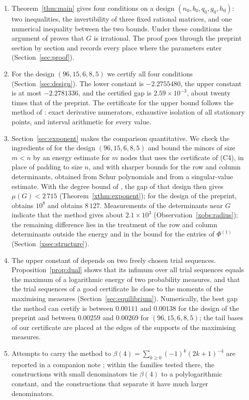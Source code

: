 \documentclass[11pt]{article}
\theoremstyle{definition}
\begin{document}
\begin{enumerate}
\item Theorem~\ref{thm:main} gives four conditions on a design $(n_0,b_0,q_0,g_0,h_0)$: two inequalities, the invertibility of three fixed rational matrices, and one numerical inequality between the two bounds. Under these conditions the argument of \cite{OAI} proves that $G$ is irrational. The proof goes through the preprint section by section and records every place where the parameters enter (Section~\ref{sec:proof}).
\item For the design $(96,15,6,8,5)$ we certify all four conditions (Section~\ref{sec:design}). The lower constant is $-2.2755480$, the upper constant is at most $-2.2781336$, and the certified gap is $2.59\times10^{-3}$, about twenty times that of the preprint. The certificate for the upper bound follows the method of \cite[Sec.~7]{OAI}: exact derivative numerators, exhaustive isolation of all stationary points, and interval arithmetic for every value.
\item Section~\ref{sec:exponent} makes the comparison quantitative. We check the ingredients of \cite{Jha} for the design $(96,15,6,8,5)$ and bound the minors of size $m<n$ by an energy estimate for $m$ nodes that uses the certificate of (C4), in place of padding to size $n$, and with sharper bounds for the row and column determinants, obtained from Schur polynomials and from a singular-value estimate. With the degree bound of \cite{Litsey}, the gap of that design then gives $\mu(G)<2\,715$ (Theorem~\ref{xthm:exponent}); for the design of the preprint, \cite{Jha} obtains $10^8$ and \cite{Litsey} obtains $8\,127$. Measurements of the determinants near $G$ indicate that the method gives about $2.1\times10^3$ (Observation~\ref{xobs:radius}); the remaining difference lies in the treatment of the row and column determinants outside the energy and in the bound for the entries of $\Phi^{(1)}$ (Section~\ref{xsec:structure}).
\item The upper constant of \cite[Prop.~6.1]{OAI} depends on two freely chosen trial sequences. Proposition~\ref{prop:dual} shows that its infimum over all trial sequences equals the maximum of a logarithmic energy of two probability measures, and that the trial sequences of a good certificate lie close to the moments of the maximising measures (Section~\ref{sec:equilibrium}). Numerically, the best gap the method can certify is between $0.00111$ and $0.00138$ for the design of the preprint and between $0.00259$ and $0.00269$ for $(96,15,6,8,5)$; the tail bases of our certificate are placed at the edges of the supports of the maximising measures.
\item Attempts to carry the method to $\beta(4)=\sum_{k\ge0}(-1)^k(2k+1)^{-4}$ are reported in a companion note \cite{MCSC3}; within the families tested there, the constructions with small denominators tie $\beta(4)$ to a polylogarithmic constant, and the constructions that separate it have much larger denominators.
\end{enumerate}
\end{document}
